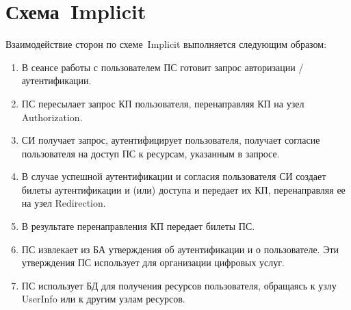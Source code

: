 \section{Схема~Implicit}\label{OIDC.Implicit}

Взаимодействие сторон по схеме~Implicit выполняется следующим образом: 

\begin{enumerate}
\item 
В сеансе работы с пользователем ПС готовит запрос авторизации / аутентификации.

\item 
ПС пересылает запрос КП пользователя, перенаправляя КП на узел Authorization.

\item 
СИ получает запрос, аутентифицирует пользователя, 
получает согласие пользователя на доступ ПС к ресурсам, 
указанным в запросе.

\item 
В случае успешной аутентификации и согласия пользователя СИ создает билеты
аутентификации и (или) доступа и передает их КП, перенаправляя ее на
узел Redirection.

\item 
В результате перенаправления КП передает билеты ПС.

\item 
ПС извлекает из БА утверждения об аутентификации и о пользователе. Эти
утверждения ПС использует для организации цифровых услуг.

\item 
ПС использует БД для получения ресурсов пользователя, обращаясь к узлу
UserInfo или к другим узлам ресурсов.
\end{enumerate}
